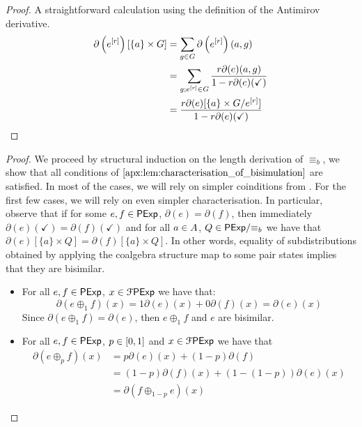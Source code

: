 \begin{proof}
    A straightforward calculation using the definition of the Antimirov derivative.
    \begin{align*}
        \partial\left(e^{[r]}\right)[\{a\} \times G] &= \sum_{g \in G}\partial\left(e^{[r]}\right)(a,g)\\
        &=\sum_{g \mathbin{;} e^{[r]} \in G} \frac{r\partial(e)(a,g)}{1-r\partial(e)(\checkmark)}\\
        &=\frac{r\partial(e)[\{a\} \times {G}/{e^{[r]}}]}{1-r\partial(e)(\checkmark)}
    \end{align*}
\end{proof}
\soundnessbisim*
\begin{proof} We proceed by structural induction on the length derivation of $\equiv_b$, we show that all conditions of $\Cref{apx:lem:characterisation_of_bisimulation}$ are satisfied. In most of the cases, we will rely on simpler coinditions from . For the first few cases, we will rely on even simpler characterisation. In particular, observe that if for some $e,f \in \mathsf{PExp}$, $\partial(e) = \partial(f)$, then immediately $\partial(e)(\checkmark)=\partial(f)(\checkmark)$ and for all $a \in {A}$, $Q \in {\mathsf{PExp}}/{\equiv_b}$ we have that $\partial(e)[\{a\}\times Q] = \partial(f)[\{a\}\times Q]$. In other words, equality of subdistributions obtained by applying the coalgebra structure map to some pair states implies that they are bisimilar.
    \begin{itemize}
        \item[] 
        For all $e,f \in \mathsf{PExp}$, $x \in\mathcal{F} \mathsf{PExp} $ we have that: 
        $$
        \partial(e \oplus_1 f)(x) = 1\partial(e)(x) + 0 \partial(f)(x) = \partial(e)(x)
        $$
        Since $\partial(e \oplus_1 f) = \partial(e)$, then $e \oplus_1 f$ and $e$ are bisimilar.

        \item[]  
        For all $e,f  \in \mathsf{PExp}$, $p \in \interval{0}{1}$ and $x \in\mathcal{F} \mathsf{PExp}$ we have that
        \begin{align*}
            \partial(e \oplus_p f)(x) &= p \partial(e)(x) + (1-p) \partial(f)\\
            &= (1-p) \partial(f)(x)  + (1-(1-p))\partial(e)(x)\\ &= \partial(f \oplus_{1-p} e)(x) 
        \end{align*}


\end{itemize}
\end{proof}
